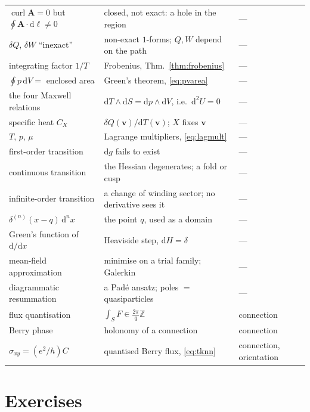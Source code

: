\documentclass[10pt,a4paper]{article}
\newcommand{\dd}{\mathrm{d}}
\newcommand{\Z}{\mathbb{Z}}
\newcommand{\vv}{\mathbf{v}}
\newcommand{\A}{\mathbf{A}}
\DeclareMathOperator{\curl}{curl}
\theoremstyle{plain}
\theoremstyle{definition}
\numberwithin{equation}{section}
\begin{document}
{\begin{tabular}{@{}L{0.345\textwidth}L{0.375\textwidth}L{0.215\textwidth}@{}}
$\curl\A=0$ but $\oint\A\cdot\dd\boldsymbol\ell\ne0$ & closed, not exact: a hole in the region & --- \\
$\delta Q$, $\delta W$ ``inexact''      & non-exact $1$-forms; $Q,W$ depend on the path & --- \\
integrating factor $1/T$                & Frobenius, Thm.~\ref{thm:frobenius} & --- \\
$\oint p\,\dd V=$ enclosed area         & Green's theorem, \eqref{eq:pvarea} & --- \\
the four Maxwell relations              & $\dd T\wedge\dd S=\dd p\wedge\dd V$, i.e.\ $\dd^2U=0$ & --- \\
specific heat $C_X$                     & $\delta Q(\vv)/\dd T(\vv)$; $X$ fixes $\vv$ & --- \\
$T$, $p$, $\mu$                         & Lagrange multipliers, \eqref{eq:lagmult} & --- \\
first-order transition                  & $\dd g$ fails to exist            & --- \\
continuous transition                   & the Hessian degenerates; a fold or cusp & --- \\
infinite-order transition               & a change of winding sector; no derivative sees it & --- \\
$\delta^{(n)}(x-q)\,\dd^nx$             & the point $q$, used as a domain   & --- \\
Green's function of $\dd/\dd x$         & Heaviside step, $\dd H=\delta$    & --- \\
mean-field approximation                & minimise on a trial family; Galerkin & --- \\
diagrammatic resummation                & a Pad\'e ansatz; poles $=$ quasiparticles & --- \\
flux quantisation                       & $\int_SF\in\frac{2\pi}{q}\Z$      & connection \\
Berry phase                             & holonomy of a connection          & connection \\
$\sigma_{xy}=(e^2/h)C$                  & quantised Berry flux, \eqref{eq:tknn} & connection, orientation \\
\bottomrule
\end{tabular}}

\section{Exercises}
\end{document}
